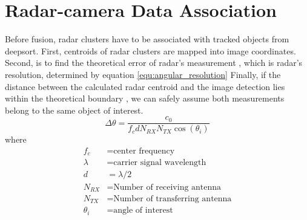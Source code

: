 \section{Radar-camera Data Association}\label{sec:2-association}
Before fusion, radar clusters have to be associated with tracked objects from deepsort.
First, centroids of radar clusters are mapped into image coordinates.
Second, is to find the theoretical error of radar's measurement \cite{8844649}, which is radar's resolution, determined by equation \ref*{equ:angular_resolution}
Finally, if the distance between the calculated radar centroid and the image detection lies within the theoretical boundary
, we can safely assume both measurements belong to the same object of interest.
\begin{equation}\label{equ:angular_resolution}
    \Delta \theta= \frac{c_0}{f_c d N_{RX} N_{TX} \cos(\theta _i)}
\end{equation}
where
\begin{align*}
    f_c & = \text{center frequency} \\
    \lambda & = \text{carrier signal wavelength} \\
    d & =  \lambda/2 \\
    N_{RX} & = \text{Number of receiving antenna}\\
    N_{TX}& = \text{Number of transferring antenna}\\
    \theta _i &= \text{angle of interest}
\end{align*}






